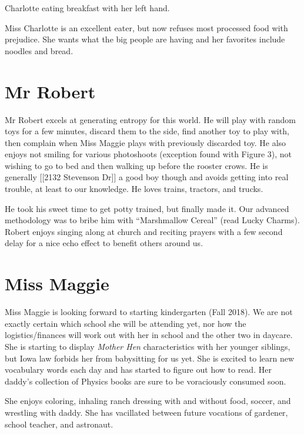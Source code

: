 \documentclass[letterpaper,11pt]{article}
\makeatletter
\newenvironment{figurehere}
  {\def\@captype{figure}}
  {}
\makeatother
\begin{document}
\begin{multicols}{2}

\begin{figurehere}
 \centering   
 \caption{Charlotte eating breakfast with her left hand.}
\end{figurehere}

Miss Charlotte is an excellent eater, but now refuses most processed food
with prejudice.  She wants what the big people are having and her favorites
include noodles and bread.

\section{Mr Robert}

Mr Robert excels at generating entropy for this world.  He will play with
random toys for a few minutes, discard them to the side, find another toy to play with,
then complain when Miss Maggie plays with previously discarded toy.  He also
enjoys not smiling for various photoshoots (exception found with Figure 3), not
wishing to go to bed and then walking up before the rooster crows.  He is generally [[2132 Stevenson Dr]] a
good boy though and avoids getting into real trouble, at least to our knowledge.  He loves trains,
tractors, and trucks.

He took his sweet time to get potty trained, but finally made it.  Our advanced
methodology was to bribe him with \enquote{Marshmallow Cereal} (read Lucky
Charms).
Robert enjoys singing along at church and reciting prayers with a few second delay for
a nice echo effect to benefit others around us.

\section{Miss Maggie}

Miss Maggie is looking forward to starting kindergarten (Fall 2018).  We
are not exactly certain which school she will be attending yet, nor how the
logistics/finances will work out with her in school and the other two in
daycare.  She is starting to display \textit{Mother Hen} characteristics with
her younger siblings, but Iowa law forbids her from babysitting for us yet.  She is
excited to learn new vocabulary words each day and has started to figure out
how to read.  Her daddy's collection of Physics books are sure to be
voraciously consumed soon.

She enjoys coloring, inhaling ranch dressing with and without food, soccer, and
wrestling with daddy.  She has vacillated between future vocations of gardener,
school teacher, and astronaut.


\end{multicols}
\end{document}

